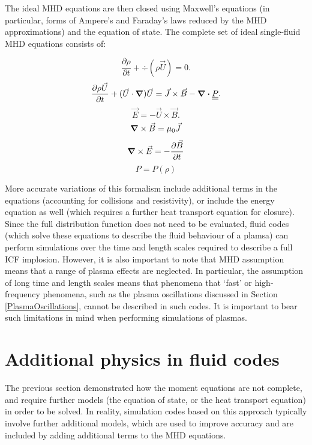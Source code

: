 The ideal MHD equations are then closed using Maxwell's equations (in particular, forms of Ampere's and Faraday's laws reduced by the MHD approximations) and the equation of state. The complete set of ideal single-fluid MHD equations consists of:

\begin{equation} \frac{\partial \rho}{\partial t} + \div (\rho \vec{U}) = 0. \end{equation}
\begin{equation} \frac{\partial \rho \vec{U}}{\partial t} + (\vec{U} \cdot \grad)\vec{U} =\vec{J} \times \vec{B} - \div \underline{\underline{P}} .\end{equation}
\begin{equation} \vec{E} = -\vec{U}\times\vec{B} . \end{equation}
\begin{equation} \grad \times \vec{B} = \mu_0 \vec{J} \end{equation}
\begin{equation} \grad \times \vec{E} = - \frac{\partial \vec{B}}{\partial t} \end{equation}
\begin{equation} P = P(\rho)  \end{equation}

More accurate variations of this formalism include additional terms in the equations (accounting for collisions and resistivity), or include the energy equation as well (which requires a further heat transport equation for closure). Since the full distribution function does not need to be evaluated, fluid codes (which solve these equations to describe the fluid behaviour of a plamsa) can perform simulations over the time and length scales required to describe a full ICF implosion. However, it is also important to note that MHD assumption means that a range of plasma effects are neglected. In particular, the assumption of long time and length scales means that phenomena that `fast' or high-frequency phenomena, such as the plasma oscillations discussed in Section \ref{PlasmaOscillations}, cannot be described in such codes. It is important to bear such limitations in mind when performing simulations of plasmas.


\section{Additional physics in fluid codes}\label{sec:additional-physics-in-fluid-codes}

The previous section demonstrated how the moment equations are not complete, and require further models (the equation of state, or the heat transport equation) in order to be solved. In reality, simulation codes based on this approach typically involve further additional models, which are used to improve accuracy and are included by adding additional terms to the MHD equations. 

